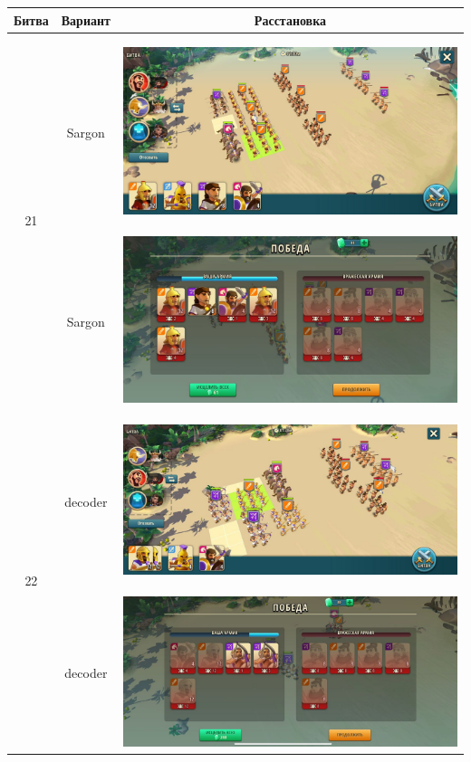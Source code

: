 \noindent
\begin{longtable}{|c|c|c|}
    \hline
    Битва & Вариант & Расстановка \\\hline\endhead
    \multirow{2}{*}{21} & Sargon &
    \hypertarget{fight21}{\includegraphics[width=0.75\linewidth]{./parts/media/TreasureHunt/21/sargon/photo_2022-04-06_18-11-33.jpg}} \\
    & Sargon &
    \includegraphics[width=0.75\linewidth]{./parts/media/TreasureHunt/21/sargon/photo_2022-04-06_18-11-59.jpg} \\
    \hline
    \multirow{4}{*}{22} & decoder &
    \hypertarget{fight22}{\includegraphics[width=0.75\linewidth]{./parts/media/TreasureHunt/22/decoder/photo_2022-04-06_18-08-54.jpg}} \\
    & decoder &
    \includegraphics[width=0.75\linewidth]{./parts/media/TreasureHunt/22/decoder/photo_2022-04-06_18-09-25.jpg} \\

\end{longtable}
